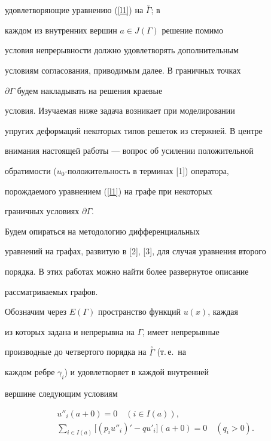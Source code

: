 удовлетворяющие уравнению (\ref{l1}) на $\overset{\circ}{\Gamma}$; в


каждом из внутренних вершин $a \in J(\Gamma)$ решение помимо


условия непрерывности должно удовлетворять дополнительным


условиям согласования, приводимым далее. В граничных точках


$\partial \Gamma$ будем накладывать на решения краевые


условия. Изучаемая ниже задача возникает при моделировании


упругих деформаций некоторых типов решеток из стержней. В центре


внимания настоящей работы --- вопрос об усилении положительной


обратимости ($u_0$-положительность в терминах [1]) оператора,


порождаемого уравнением (\ref{l1}) на графе при некоторых


граничных условиях $\partial \Gamma$.


Будем опираться на методологию дифференциальных


уравнений на графах, развитую в [2], [3], для случая уравнения второго


порядка. В этих работах можно найти более развернутое описание


рассматриваемых графов.





Обозначим через $E(\Gamma)$ пространство функций $u(x)$, каждая


из которых задана и непрерывна на $\Gamma$, имеет непрерывные


производные до четвертого порядка на $\overset{\circ}{\Gamma}$ (т.\,е.~на


каждом ребре $\gamma_i$) и удовлетворяет в каждой внутренней


вершине следующим условиям


\begin{gather}


\label{l2}


u''_i(a+0)=0\quad (i \in I(a)),\\


\label{l3}


\sum_{i \in I(a)}\bigl[(p_iu''_{i})'-q u'_{i}\bigr](a+0)=0


\quad (q_i>0).


\end{gather}


